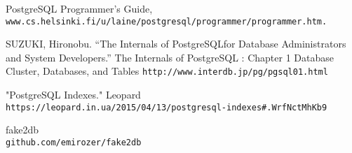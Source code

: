 \documentclass[a4paper]{article}
\begin{document}
\begin{thebibliography}{10}
PostgreSQL Programmer's Guide,  
\\\texttt{www.cs.helsinki.fi/u/laine/postgresql/programmer/programmer.htm.}


SUZUKI, Hironobu. “The Internals of PostgreSQLfor Database Administrators and System Developers.” The Internals of PostgreSQL : Chapter 1 Database Cluster, Databases, and Tables
\texttt{http://www.interdb.jp/pg/pgsql01.html}

"PostgreSQL Indexes." Leopard
\\\texttt{https://leopard.in.ua/2015/04/13/postgresql-indexes\#.WrfNctMhKb9}


fake2db
\\\texttt{github.com/emirozer/fake2db}



\end{thebibliography}
\end{document}
